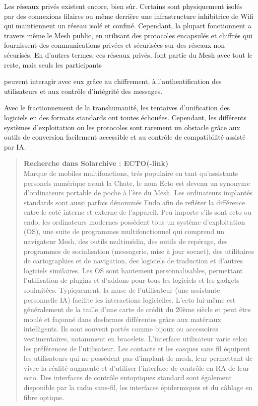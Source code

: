 Les réseaux privés existent encore, bien sûr. Certains sont physiquement isolés par des connexions filaires ou même derrière une infrastructure inhibitrice de Wifi qui maintiennent un réseau isolé et confiné. Cependant, la plupart fonctionnent a travers même le Mesh public, en utilisant des protocoles encapsulés et chiffrés qui fournissent des communications privées et sécurisées sur des réseaux non sécurisés. En d'autres termes, ces réseaux privés, font partie du Mesh avec tout le reste, mais seuls les participants 

peuvent interagir avec eux grâce au chiffrement, à l'authentification des utilisateurs et aux contrôle d'intégrité des messages. 

Avec le fractionnement de la transhumanité, les tentaives d'unification des logiciels en des formats standards ont toutes échouées. Cependant, les différents systèmes d'exploitation ou les protocoles sont rarement un obstacle grâce aux outils de conversion facilement accessible et au contrôle de compatibilité assisté par IA. 

\begin{quotation} \textbf{Recherche dans Solarchive : ECTO(-link)} \\ Marque de mobiles multifonctions, trés populaire en tant qu'assistants personels numérique avant la Chute, le nom Ecto est devenu un synonyme d'ordinateurs portable de poche à l'ère du Mesh. Les ordinateurs implantés standards sont aussi parfois dénommés Endo afin de refléter la différence entre le coté interne et externe de l'appareil. Peu importe s'ils sont ecto ou endo, les ordinateurs modernes possèdent tous un système d'exploitation (OS), une suite de programmes multifonctionnel qui comprend un navigateur Mesh, des outils multimédia, des outils de repérage, des programmes de socialisation (messagerie, mise à jour socnet), des utilitaires de cartographies et de navigation, des logiciels de traduction et d'autres logiciels similaires. Les OS sont hautement personnalisables, permettant l'utilisation de plugins et d'addons pour tous les logiciels et les gadgets souhaitées. Typiquement, la muse de l'utilisateur (une assistante personnelle IA) facilite les interactions logicielles. L'ecto lui-même est généralement de la taille d'une carte de crédit du 20ème siècle et peut être moulé et façonné dans desformes différentes grâce aux matériaux intelligents. Ils sont souvent portés comme bijoux ou accessoires vestimentaires, notamment en bracelets. L'interface utilisateur varie selon les préférences de l'utilisateur. Les contacts et les casques sans fil équipent les utilisateurs qui ne possèdent pas d'implant de mesh, leur permettant de vivre la réalité augmenté et d'utiliser l'interface de contrôle en RA de leur ecto. Des interfaces de contrôle entoptiques standard sont également disponible par la radio sans-fil, les interfaces épidermiques et du câblage en fibre optique. \end{quotation} 



